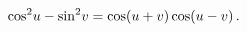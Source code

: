 \[{\mathop{\cos\/}\nolimits^{2}}u-{\mathop{\sin\/}\nolimits^{2}}v=\mathop{\cos\/%
}\nolimits\!\left(u+v\right)\mathop{\cos\/}\nolimits\!\left(u-v\right).\]